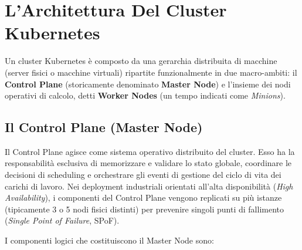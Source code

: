 \documentclass[11pt, a4paper]{article}
\begin{document}
\newpage


\section{L'Architettura Del Cluster Kubernetes}

Un cluster Kubernetes è composto da una gerarchia distribuita di macchine (server fisici o macchine virtuali) ripartite funzionalmente in due macro-ambiti: il \textbf{Control Plane} (storicamente denominato \textbf{Master Node}) e l'insieme dei nodi operativi di calcolo, detti \textbf{Worker Nodes} (un tempo indicati come \emph{Minions}).



\subsection{Il Control Plane (Master Node)}
Il Control Plane agisce come sistema operativo distribuito del cluster. Esso ha la responsabilità esclusiva di memorizzare e validare lo stato globale, coordinare le decisioni di scheduling e orchestrare gli eventi di gestione del ciclo di vita dei carichi di lavoro. Nei deployment industriali orientati all'alta disponibilità (\emph{High Availability}), i componenti del Control Plane vengono replicati su più istanze (tipicamente 3 o 5 nodi fisici distinti) per prevenire singoli punti di fallimento (\emph{Single Point of Failure}, SPoF).

I componenti logici che costituiscono il Master Node sono:
\end{document}
